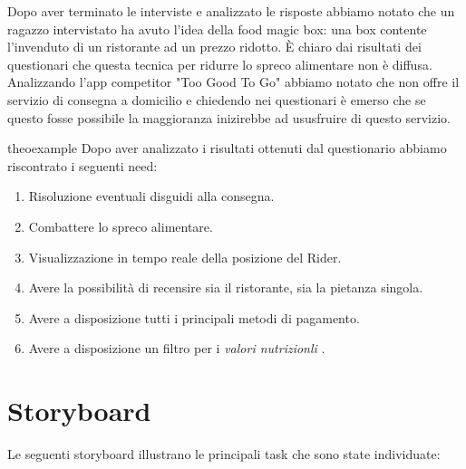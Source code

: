 \documentclass{article}
\begin{document}
Dopo aver terminato le interviste e analizzato le risposte abbiamo notato che un ragazzo intervistato ha avuto l'idea della food magic box: una box contente l'invenduto di un ristorante ad un prezzo ridotto. È chiaro dai risultati dei questionari che questa tecnica per ridurre lo spreco alimentare non è diffusa. Analizzando l'app competitor "Too Good To Go" abbiamo notato che non offre il servizio di consegna a domicilio e chiedendo nei questionari è emerso che se questo fosse possibile la maggioranza inizirebbe ad ususfruire di questo servizio.
\begin{need}{}{theoexample}
    Dopo aver analizzato i risultati ottenuti dal questionario abbiamo riscontrato i seguenti need:
    \begin{enumerate}
        \item Risoluzione eventuali disguidi alla consegna.
        \item Combattere lo spreco alimentare.
        \item Visualizzazione in tempo reale della posizione del Rider.
        \item Avere la possibilità di recensire sia il ristorante, sia la pietanza singola.
        \item Avere a disposizione tutti i principali metodi di pagamento.
        \item Avere a disposizione un filtro per i \textit{valori nutrizionli} .
    \end{enumerate}
    \end{need}

    \vspace{1cm}
 \vspace{4cm}
\pagebreak
\section{Storyboard} \par
Le seguenti storyboard illustrano le principali task che sono state individuate:
\end{document}
